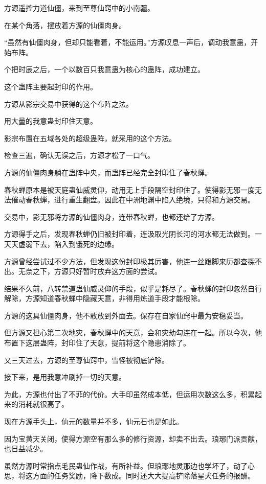 \begin{this_body}
方源遥控力道仙僵，来到至尊仙窍中的小南疆。

在某个角落，摆放着方源的仙僵肉身。

“虽然有仙僵肉身，但却只能看着，不能运用。”方源叹息一声后，调动我意蛊，开始布阵。

个把时辰之后，一个以数百只我意蛊为核心的蛊阵，成功建立。

这个蛊阵主要起封印的作用。

方源从影宗交易中获得的这个布阵之法。

用大量的我意蛊封印住天意。

影宗布置在五域各处的超级蛊阵，就采用的这个方法。

检查三遍，确认无误之后，方源才松了一口气。

方源的仙僵肉身躺在蛊阵中央，而蛊阵已经完全封印住了春秋蝉。

春秋蝉原本是被天庭蛊仙威灵仰，动用无上手段隔空封印住了。使得影无邪一度无法催动春秋蝉，进行重生翻盘。因此在中洲地渊中陷入绝境，只得和方源交易。

交易中，影无邪将方源的仙僵肉身，连带春秋蝉，也都还给了方源。

方源得手之后，发现春秋蝉仍旧被封印着，连汲取光阴长河的河水都无法做到。一天天虚弱下去，陷入到饿死的边缘。

方源曾经尝试过不少方法，但发现这份封印极其厉害，他连一丝跟脚来历都查探不出。无奈之下，方源只好暂时放弃这方面的尝试。

结果不久前，八转禁道蛊仙威灵仰的手段，似乎是耗尽了。春秋蝉的封印忽然自行解除，方源知道春秋蝉中隐藏天意，非得用炼道手段才能根除。

方源的这具仙僵肉身，他不敢放到外面去。保存在自家仙窍中最为安稳妥当。

但方源又担心第二次地灾，春秋蝉中的天意，会和灾劫勾连在一起。所以今次，他布置下这层蛊阵，封印住了天意，提前将这个隐患消除了。

又三天过去，方源的至尊仙窍中，雪怪被彻底铲除。

接下来，是用我意冲刷掉一切的天意。

为此，方源也付出了不菲的代价。大手印虽然成本低，但运用次数这么多，积累起来的消耗就很高了。

现在方源手头上，仙元的数量并不多，仙元石也是如此。

因为宝黄天关闭，使得方源空有那么多的修行资源，却卖不出去。琅琊门派贡献，也日益减少。

虽然方源时常指点毛民蛊仙作战，有所补益。但琅琊地灵那边也学坏了，动了心思，将这方面的任务奖励，降下数成。同时还大大提高铲除落星犬任务的报酬。


\end{this_body}
